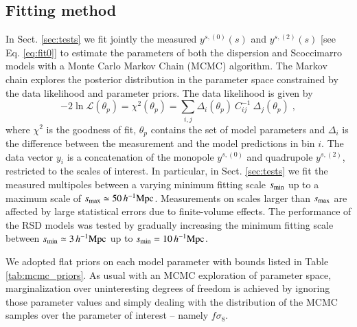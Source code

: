 \documentclass[longauth]{aa}
\def\({\left(}
\def\){\right)}
\def\mhmpc{\,h^{-1}{\rm Mpc}}
\begin{document}
\subsection{Fitting method}

In Sect. \ref{sec:tests} we fit jointly the measured $y^{s,\(0\)}\(s\)$ and $y^{s,\(2\)}\(s\)$ [see Eq. \eqref{eq:fit0}] to estimate the parameters of both the dispersion and Scoccimarro models with a Monte Carlo Markov Chain (MCMC) algorithm.  The Markov chain explores the posterior distribution in the parameter space constrained by the data likelihood and parameter priors.  The data likelihood is given by
	\begin{equation}
		-2\ln\mathcal{L}\(\theta_p\) = \chi^2\(\theta_p\) = \sum_{i,j}\Delta_i\(\theta_p\)\ C_{ij}^{-1}\ \Delta_j\(\theta_p\)	\; ,		\label{eq:chi}
	\end{equation}
where $\chi^2$ is the goodness of fit, $\theta_p$ contains the set of model parameters and $\Delta_i$ is the difference between the measurement and the model predictions in bin $i$.  The data vector $y_i$ is a concatenation of the monopole $y^{s,\(0\)}$ and quadrupole $y^{s,\(2\)}$, restricted to the scales of interest. In particular, in Sect. \ref{sec:tests} we fit the measured multipoles between a varying minimum fitting scale $s_{\rm{min}}$ up to a maximum scale of $s_{\rm{max}}\simeq50\mhmpc$. Measurements on scales larger than $s_{\rm{max}}$ are affected by large statistical errors due to finite-volume effects. The performance of the RSD models was tested by gradually increasing the minimum fitting scale between $s_{\rm{min}}\simeq3\mhmpc$ up to $s_{\rm{min}}=10\mhmpc$. 

We adopted flat priors on each model parameter with bounds listed in Table \ref{tab:mcmc_priors}. As usual with an MCMC exploration of parameter space, marginalization over uninteresting degrees of freedom is achieved by ignoring those parameter values and simply dealing with the distribution of the MCMC samples over the parameter of interest -- namely $f\sigma_8$.
\end{document}
